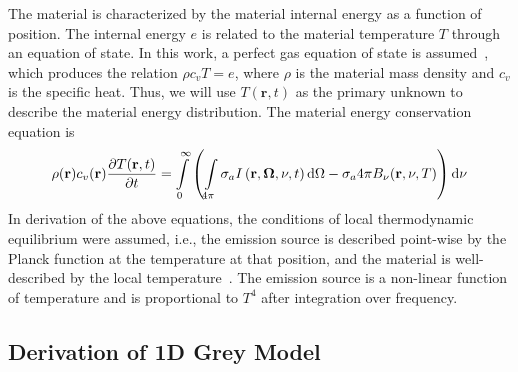 The material is characterized by the material internal
energy as a function of position.  The internal energy $e$ is related to the material
temperature $T$ through an equation of state.   In this work, a perfect gas equation of state is
assumed~\cite{toro}, which produces the relation $\rho c_v T = e$, where $\rho$ is the
material mass density and $c_v$ is the specific heat.  Thus, we will use $T(\mathbf{r},t)$ as the
primary unknown to describe the material energy distribution.  The material energy conservation equation is
\begin{equation}
    \rho(\mathbf{r}) c_v(\mathbf{r}) \frac{\partial T(\mathbf{r},t)}{\partial t} = \int\limits_0^\infty
    \left( \int\limits_{4\pi} \sigma_a I \left(\mathbf{r},\mathbf{\Omega},\nu,t\right) \mathrm{d} \Omega - \sigma_a 4\pi B_\nu(\mathbf{r},\nu,T) \right) \mathrm{d} \nu
 \end{equation}
 In derivation of the above equations, the conditions of local thermodynamic equilibrium
were assumed, i.e., the emission source is described point-wise by the
Planck function at the temperature at that position, and the material is well-described by
the local temperature~\cite{mihalas,wollaber_thesis}. The emission source is a non-linear function of temperature and is
proportional to $T^4$ after integration over frequency.  

\subsection{Derivation of 1D Grey Model}

